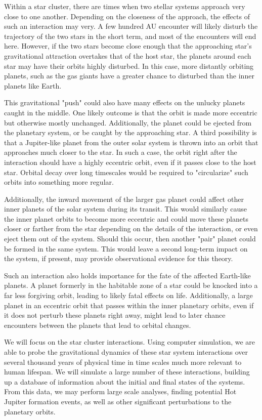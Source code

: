 \documentclass[12pt]{article}
\begin{document}
Within a star cluster, there are times when two stellar systems approach very close
to one another. Depending on the closeness of the approach, the effects of such
an interaction may very. A few hundred AU encounter will likely disturb the trajectory
of the two stars in the short term, and most of the encounters will end here. However,
if the two stars become close enough that the approaching star's gravitational attraction
overtakes that of the host star, the planets around each star may have their orbits
highly disturbed. In this case, more distantly orbiting planets, such as the gas giants
have a greater chance to disturbed than the inner planets like Earth.

This gravitational "push" could also have many effects on the unlucky planets caught in the
middle. One likely outcome is that the orbit is made more eccentric but otherwise
mostly unchanged. Additionally, the planet could be ejected from the planetary system,
or be caught by the approaching star. A third possibility is that a Jupiter-like planet
from the outer solar system is thrown into an orbit that approaches much closer to the
star. In such a case, the orbit right after the interaction should have a highly
eccentric orbit, even if it passes close to the host star. Orbital decay over long
timescales would be required to "circularize" such orbits into something more regular.

Additionally, the inward movement of the larger gas planet could affect other
inner planets of the solar system during its transit. This would similarly 
cause the inner planet orbits to become more eccentric and could move
these planets closer or farther from the star depending on the details of the
interaction, or even eject them out of the system. Should this occur,
then another "pair" planet could be formed in the same system. This would leave
a second long-term impact on the system, if present, may provide observational
evidence for this theory.

Such an interaction also holds importance for the fate of the affected Earth-like planets.
A planet formerly in the habitable zone of a star could be knocked into a far less
forgiving orbit, leading to likely fatal effects on life. Additionally, a
large planet in an eccentric orbit that passes within the inner planetary orbits,
even if it does not perturb these planets right away, might lead to later chance
encounters between the planets that lead to orbital changes.

We will focus on the star cluster interactions. Using computer simulation,
we are able to probe the gravitational dynamics of these star system 
interactions over several thousand years of physical time 
in time scales much more relevant to human lifespan. We will simulate
a large number of these interactions, building up a database of information about
the initial and final states of the systems. From this data, we may perform large
scale analyses, finding potential Hot Jupiter formation events, as well as other
significant perturbations to the planetary orbits.
\end{document}
